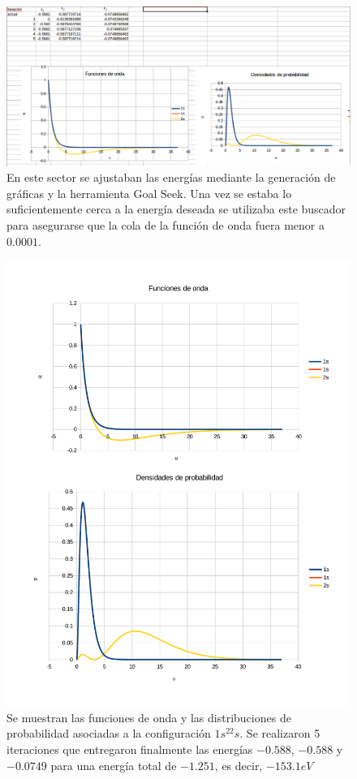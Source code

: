\documentclass[a4paper]{article}
\begin{document}
\begin{figure}
\begin{center}
\includegraphics[width = \textwidth]{final_atomica_4.png}
\caption{\label{fig:trabajo}En este sector se ajustaban las energías mediante la generación de gráficas y la herramienta Goal Seek. Una vez se estaba lo suficientemente cerca a la energía deseada se utilizaba este buscador para asegurarse que la cola de la función de onda fuera menor a $0.0001$.}
\end{center}
\end{figure}

\begin{figure}
\begin{center}
\includegraphics[width = \textwidth]{1s_1s_2s.pdf}
\caption{\label{fig:2s}Se muestran las funciones de onda y las distribuciones de probabilidad asociadas a la configuración $1s^22s$. Se realizaron 5 iteraciones que entregaron finalmente las energías $-0.588$, $-0.588$ y $-0.0749$ para una energía total de $-1.251$, es decir, $-153.1eV$}
\end{center}
\end{figure}
\end{document}
